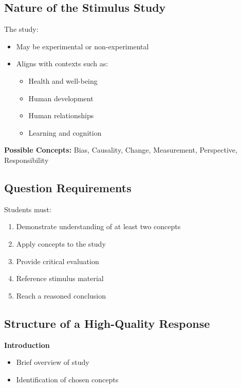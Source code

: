 \documentclass[12pt,a4paper]{article}
\begin{document}
\subsection*{Nature of the Stimulus Study}

The study:
\begin{itemize}
    \item May be experimental or non-experimental
    \item Aligns with contexts such as:
    \begin{itemize}
        \item Health and well-being
        \item Human development
        \item Human relationships
        \item Learning and cognition
    \end{itemize}
\end{itemize}

\textbf{Possible Concepts:}
Bias, Causality, Change, Measurement, Perspective, Responsibility

\subsection*{Question Requirements}

Students must:
\begin{enumerate}
    \item Demonstrate understanding of at least two concepts
    \item Apply concepts to the study
    \item Provide critical evaluation
    \item Reference stimulus material
    \item Reach a reasoned conclusion
\end{enumerate}

\subsection*{Structure of a High-Quality Response}

\textbf{Introduction}
\begin{itemize}
    \item Brief overview of study
    \item Identification of chosen concepts
\end{itemize}
\end{document}
